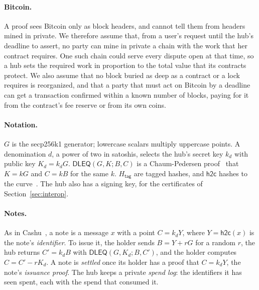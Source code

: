 \documentclass[11pt]{article}
\newcommand{\htc}{\mathsf{h2c}}
\newcommand{\DLEQ}{\mathsf{DLEQ}}
\begin{document}
\paragraph{Bitcoin.} A proof sees Bitcoin only as block headers, and cannot tell them from headers mined in private. We therefore assume that, from a user's request until the hub's deadline to assert, no party can mine in private a chain with the work that her contract requires. One such chain could serve every dispute open at that time, so a hub sets the required work in proportion to the total value that its contracts protect. We also assume that no block buried as deep as a contract or a lock requires is reorganized, and that a party that must act on Bitcoin by a deadline can get a transaction confirmed within a known number of blocks, paying for it from the contract's fee reserve or from its own coins.

\paragraph{Notation.} $G$ is the secp256k1 generator; lowercase scalars multiply uppercase points. A denomination $d$, a power of two in satoshis, selects the hub's secret key $k_d$ with public key $K_d=k_dG$. $\DLEQ(G,K;B,C)$ is a Chaum-Pedersen proof~\cite{chaumpedersen} that $K=kG$ and $C=kB$ for the same $k$. $H_{\mathsf{tag}}$ are tagged hashes, and $\htc$ hashes to the curve~\cite{rfc9380}. The hub also has a signing key, for the certificates of Section~\ref{sec:interop}.

\paragraph{Notes.} As in Cashu~\cite{cashu}, a note is a message $x$ with a point $C=k_dY$, where $Y=\htc(x)$ is the note's \emph{identifier}. To issue it, the holder sends $B=Y+rG$ for a random $r$, the hub returns $C'=k_dB$ with $\DLEQ(G,K_d;B,C')$, and the holder computes $C=C'-rK_d$. A note is \emph{settled} once its holder has a proof that $C=k_dY$, the note's \emph{issuance proof}. The hub keeps a private \emph{spend log}: the identifiers it has seen spent, each with the spend that consumed it.
\end{document}
